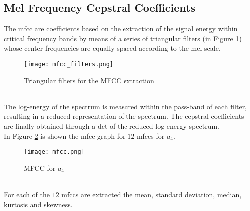 \subsection{Mel Frequency Cepstral Coefficients}
The \gls{mfcc} are coefficients based on the extraction of the signal energy within critical frequency bands by means of a series of triangular filters (in Figure \ref{fig:mfcc_filters}) whose center frequencies are equally spaced according to the mel scale.
\begin{figure}[h]
    \centering
    \texttt{[image: mfcc\_filters.png]} 
	\caption{Triangular filters for the MFCC extraction}
    \label{fig:mfcc_filters}
\end{figure}
\\
The log-energy of the spectrum is measured within the pass-band of each filter, resulting in a reduced representation of the spectrum. The cepstral coefficients are finally obtained through a \gls{dct} of the reduced log-energy spectrum.
\\
In Figure \ref{fig:mfcc} is shown the \gls{mfcc} graph for $12$ mfccs for $a_4$.
\begin{figure}[h]
    \centering
    \texttt{[image: mfcc.png]} 
	\caption{MFCC for $a_4$}
    \label{fig:mfcc}
\end{figure}
\\
For each of the $12$ \gls{mfcc}s are extracted the mean, standard deviation, median, kurtosis and skewness.

\newpage

